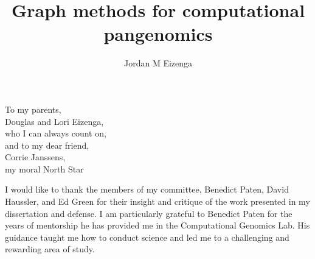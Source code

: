 \documentclass[11pt]{ucthesis}
\begin{document}

\title{Graph methods for computational pangenomics}
\author{Jordan M Eizenga}
\deanlinethree{}

\begin{frontmatter}

\maketitle
\copyrightpage

\tableofcontents
\listoffigures
\listoftables

\begin{abstract}


\end{abstract}

\begin{dedication}
\null\vfil
{\large
\begin{center}
To my parents,\\%
Douglas and Lori Eizenga,\\%
who I can always count on, \\\vspace{48pt}
and to my dear friend, \\%
Corrie Janssens,\\%
my moral North Star
\end{center}}
\vfil\null
\end{dedication}


\begin{acknowledgements}

I would like to thank the members of my committee, Benedict Paten, David Haussler, and Ed Green for their insight and critique of the work presented in my dissertation and defense. I am particularly grateful to Benedict Paten for the years of mentorship he has provided me in the Computational Genomics Lab. His guidance taught me how to conduct science and led me to a challenging and rewarding area of study.


\end{acknowledgements}
\end{frontmatter}
\end{document}
